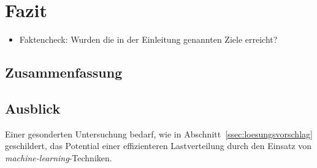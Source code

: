 \chapter{Fazit}

\begin{itemize}
    \item Faktencheck: Wurden die in der Einleitung genannten Ziele erreicht?
\end{itemize}

\section{Zusammenfassung}

\section{Ausblick}

Einer gesonderten Untersuchung bedarf, wie in Abschnitt~\ref{ssec:loesungsvorschlag} geschildert, das Potential einer
effizienteren Lastverteilung durch den Einsatz von \textit{machine-learning}-Techniken.
